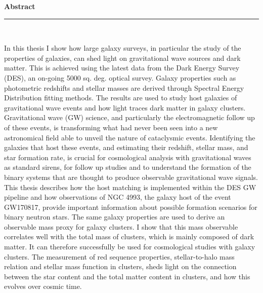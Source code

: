 \thispagestyle{empty}
\begin{raggedleft}
\vspace*{23mm}
\hfill {\huge {\bf {Abstract}}} \\
\vspace{6mm}
\hfill \rule{4in}{.015in} \\
\vspace{19mm}
\end{raggedleft}

\noindent{ }

In this thesis I show how large galaxy surveys, in particular the study of the properties of galaxies, can shed light on gravitational wave sources and dark matter. This is achieved using the latest data from the Dark Energy Survey (DES), an on-going 5000 sq. deg. optical survey. Galaxy properties such as photometric redshifts and stellar masses are derived through Spectral Energy Distribution fitting methods. The results are used to study host galaxies of gravitational wave events and how light traces dark matter in galaxy clusters.
Gravitational wave (GW) science, and particularly the electromagnetic follow up of these events, is transforming what had never been seen into a new astronomical field able to unveil the nature of cataclysmic events. Identifying the galaxies that host these events, and estimating their redshift, stellar mass, and star formation rate, is crucial for cosmological analysis with gravitational waves as standard sirens, for follow up studies and to understand the formation of the binary systems that are thought to produce observable gravitational wave signals. This thesis describes how the host matching is implemented within the DES GW pipeline and how observations of NGC 4993, the galaxy host of the event GW170817, provide important information about possible formation scenarios for binary neutron stars.
The same galaxy properties are used to derive an observable mass proxy for galaxy clusters. I show that this mass observable correlates well with the total mass of clusters, which is mainly composed of dark matter. It can therefore successfully be used for cosmological studies with galaxy clusters. The measurement of red sequence properties, stellar-to-halo mass relation and stellar mass function in clusters, sheds light on the connection between the star content and the total matter content in clusters, and how this evolves over cosmic time.


